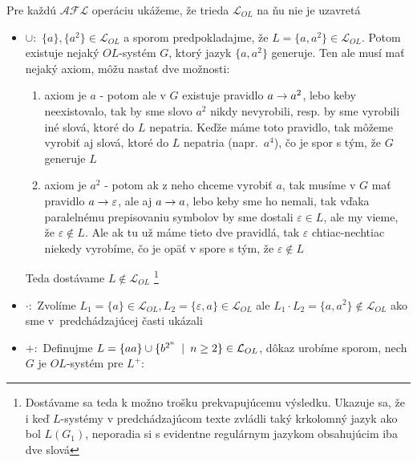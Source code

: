 \begin{dokaz}
    Pre každú $\mathcal{AFL}$ operáciu ukážeme, že trieda
    $\mathcal{L}_{OL}$ na ňu nie je uzavretá

    \begin{itemize}
    \item $\cup :$ $\{a\},\{a^{2}\}\in\mathcal{L}_{OL}$ a sporom
        predpokladajme, že $L=\{a,a^{2}\}\in\mathcal{L}_{OL}$. Potom
        existuje nejaký $OL$-systém $G$, ktorý jazyk $\{a,a^{2}\}$
        generuje. Ten ale musí mať nejaký axiom, môžu nastať dve možnosti:

        \begin{enumerate}
        \item axiom je $a$ - potom ale v $G$ existuje pravidlo $a\rightarrow
            a^{2}$, lebo keby neexistovalo, tak by sme slovo $a^{2}$ nikdy
            nevyrobili, resp. by sme vyrobili iné slová, ktoré do $L$
            nepatria. Keďže máme toto pravidlo, tak môžeme vyrobiť aj slová,
            ktoré do $L$ nepatria \mbox{(napr. $a^{4}$)}, čo je spor s tým, že
            $G$ generuje $L$

        \item axiom je $a^{2}$ - potom ak z neho chceme vyrobiť $a$, tak
            musíme v $G$ mať pravidlo $a\rightarrow\varepsilon$, ale aj $a\rightarrow a$, lebo
            keby sme ho nemali, tak vďaka paralelnému prepisovaniu symbolov by
            sme dostali $\varepsilon\in L$, ale my vieme, že
            $\varepsilon\not\in L$. Ale ak tu už máme tieto dve pravidlá, tak
            $\varepsilon$ chtiac-nechtiac niekedy vyrobíme, čo je opäť v spore
            s tým, že $\varepsilon\not\in L$
        \end{enumerate}

        Teda dostávame $L\not\in\mathcal{L}_{OL}$ \footnote{Dostávame sa
        teda k možno trošku prekvapujúcemu výsledku. Ukazuje sa, že i keď
        $L$-systémy v predchádzajúcom texte zvládli taký krkolomný jazyk
        ako bol $L(G_{1})$, neporadia si s evidentne regulárnym jazykom
        obsahujúcim iba dve slová}

    \item $\cdot :$ Zvolíme $L_{1}=\{a\}\in\mathcal{L}_{OL},
        L_{2}=\{\varepsilon,a\}\in\mathcal{L}_{OL}$ ale $L_{1}\cdot
        L_{2}=\{a,a^{2}\}\not\in\mathcal{L}_{OL}$ ako sme \mbox{v
        predchádzajúcej} časti ukázali

    \item $+ :$ Definujme $L=\{aa\}\cup\{b^{2^{n}}\enspace |\enspace
        n\geq2\}\in\mathcal{L}_{OL}$, dôkaz urobíme sporom, nech $G$ je
        $OL$-systém pre $L^{+}$:


\end{itemize}
\end{dokaz}
